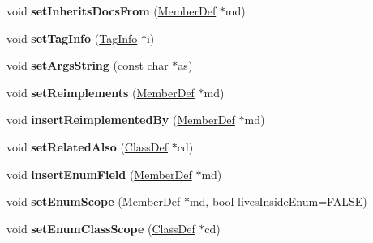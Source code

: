 \begin{DoxyCompactItemize}
\item 
\hypertarget{class_member_def_ace38f1a2c8a000f53143a9833eb7bedb}{void {\bfseries set\-Inherits\-Docs\-From} (\hyperlink{class_member_def}{Member\-Def} $\ast$md)}\label{class_member_def_ace38f1a2c8a000f53143a9833eb7bedb}

\item 
\hypertarget{class_member_def_a50c7be7b75a805f08d3224f8f87a95fb}{void {\bfseries set\-Tag\-Info} (\hyperlink{struct_tag_info}{Tag\-Info} $\ast$i)}\label{class_member_def_a50c7be7b75a805f08d3224f8f87a95fb}

\item 
\hypertarget{class_member_def_af07568eb8fefc8e96e4ff3181bfb56bb}{void {\bfseries set\-Args\-String} (const char $\ast$as)}\label{class_member_def_af07568eb8fefc8e96e4ff3181bfb56bb}

\item 
\hypertarget{class_member_def_a2c827dcde6226452362880faccbf6fc1}{void {\bfseries set\-Reimplements} (\hyperlink{class_member_def}{Member\-Def} $\ast$md)}\label{class_member_def_a2c827dcde6226452362880faccbf6fc1}

\item 
\hypertarget{class_member_def_a4cd56a221460a096bc2db31be0bdbfc9}{void {\bfseries insert\-Reimplemented\-By} (\hyperlink{class_member_def}{Member\-Def} $\ast$md)}\label{class_member_def_a4cd56a221460a096bc2db31be0bdbfc9}

\item 
\hypertarget{class_member_def_a975e978e761a68db89d9116a67ffc5a7}{void {\bfseries set\-Related\-Also} (\hyperlink{class_class_def}{Class\-Def} $\ast$cd)}\label{class_member_def_a975e978e761a68db89d9116a67ffc5a7}

\item 
\hypertarget{class_member_def_ac7bdfab2bda2d3cf1fa02b0139303bed}{void {\bfseries insert\-Enum\-Field} (\hyperlink{class_member_def}{Member\-Def} $\ast$md)}\label{class_member_def_ac7bdfab2bda2d3cf1fa02b0139303bed}

\item 
\hypertarget{class_member_def_a25b6d48ab2cae3dc8a22cbe46c96e00c}{void {\bfseries set\-Enum\-Scope} (\hyperlink{class_member_def}{Member\-Def} $\ast$md, bool lives\-Inside\-Enum=F\-A\-L\-S\-E)}\label{class_member_def_a25b6d48ab2cae3dc8a22cbe46c96e00c}

\item 
\hypertarget{class_member_def_ad4cb074fa224adc1f4a80f1c806f87f3}{void {\bfseries set\-Enum\-Class\-Scope} (\hyperlink{class_class_def}{Class\-Def} $\ast$cd)}\label{class_member_def_ad4cb074fa224adc1f4a80f1c806f87f3}


\end{DoxyCompactItemize}
